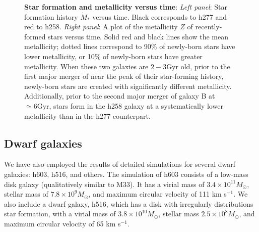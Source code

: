 \documentclass[nofootinbib,twocolumn,prd]{emulateapj}
\newcommand\msun{M_\odot}
\newcommand\unit[1]{\text{#1}}
\newcommand\ExcitingGalaxy{h258}
\newcommand\BoringGalaxy{h277}
\newcommand\DwarfOne{h603}
\newcommand\DwarfTwo{h516}
\begin{document}
\begin{figure}
\caption{\label{fig:TwoGalaxies}\textbf{Star formation and metallicity versus time}:  \emph{Left panel}: Star formation history $\dot{M}_{*}$
  versus time.  Black corresponds to \BoringGalaxy{} and red to \ExcitingGalaxy.  
\emph{Right panel}: A plot of the  metallicity $Z$ of recently-formed stars versus time.  Solid red and black lines show
the mean metallicity; dotted lines correspond to  90\% of newly-born stars have lower metallicity,   or 10\% of
newly-born stars have greater metallicity.  When these two galaxies are $2-3\unit{Gyr}$ old, prior to the first major
merger of  near the peak of their
star-forming history, newly-born stars are created with significantly different metallicity.  Additionally, prior to the
second major merger of galaxy B at $\simeq 6\unit{Gyr}$, stars form in the \ExcitingGalaxy{} galaxy at a systematically lower
metallicity than in the \BoringGalaxy{} counterpart.
}
\end{figure}


\subsection{Dwarf galaxies}

We have also employed the results of detailed simulations for several dwarf galaxies: \DwarfOne{}, \DwarfTwo{}, and others.  The simulation of h603 consists of a low-mass disk galaxy (qualitatively similar to M33).  It has a virial mass of $3.4 \times 10^{11} \msun$, stellar mass of $7.8 \times 10^9 \msun$, and maximum circular velocity of 111 km s$^{-1}$.  We also include a dwarf galaxy, h516, which has a disk with irregularly distributions star formation, with a virial mass of $3.8 \times 10^{10}\msun$, stellar mass $2.5 \times 10^8 \msun$, and maximum circular velocity of 65 km s$^{-1}$.

\end{document}

